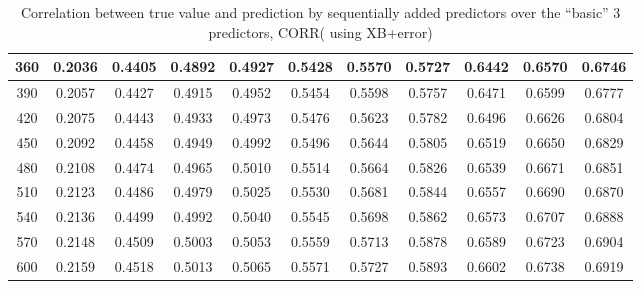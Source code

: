 \documentclass[12pt]{report}
\begin{document}
\begin{table}[h!]
{\begin{tabular}{||c c c c c c c c c c c||}
        360 & 0.2036 & 0.4405 & 0.4892 & 0.4927 & 0.5428 & 0.5570 & 0.5727 & 0.6442 & 0.6570 & 0.6746 \\ \hline
        390 & 0.2057 & 0.4427 & 0.4915 & 0.4952 & 0.5454 & 0.5598 & 0.5757 & 0.6471 & 0.6599 & 0.6777 \\ \hline
        420 & 0.2075 & 0.4443 & 0.4933 & 0.4973 & 0.5476 & 0.5623 & 0.5782 & 0.6496 & 0.6626 & 0.6804 \\ \hline
        450 & 0.2092 & 0.4458 & 0.4949 & 0.4992 & 0.5496 & 0.5644 & 0.5805 & 0.6519 & 0.6650 & 0.6829 \\ \hline
        480 & 0.2108 & 0.4474 & 0.4965 & 0.5010 & 0.5514 & 0.5664 & 0.5826 & 0.6539 & 0.6671 & 0.6851 \\ \hline
        510 & 0.2123 & 0.4486 & 0.4979 & 0.5025 & 0.5530 & 0.5681 & 0.5844 & 0.6557 & 0.6690 & 0.6870 \\ \hline
        540 & 0.2136 & 0.4499 & 0.4992 & 0.5040 & 0.5545 & 0.5698 & 0.5862 & 0.6573 & 0.6707 & 0.6888 \\ \hline
        570 & 0.2148 & 0.4509 & 0.5003 & 0.5053 & 0.5559 & 0.5713 & 0.5878 & 0.6589 & 0.6723 & 0.6904 \\ \hline
        600 & 0.2159 & 0.4518 & 0.5013 & 0.5065 & 0.5571 & 0.5727 & 0.5893 & 0.6602 & 0.6738 & 0.6919 \\ \hline
\end{tabular}}
\caption{Correlation between true value and prediction by sequentially added predictors over the “basic” 3 predictors, CORR( using XB+error)}
\label{table:CORRlinear}
\end{table}
\end{document}
